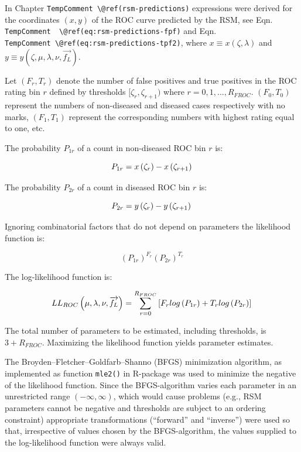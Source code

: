 \documentclass[
]{book}
\begin{document}
In Chapter \texttt{TempComment\ \textbackslash{}@ref(rsm-predictions)} expressions were derived for the coordinates \((x,y)\) of the ROC curve predicted by the RSM, see Eqn. \texttt{TempComment\ \ \textbackslash{}@ref(eq:rsm-predictions-fpf)} and Eqn. \texttt{TempComment\ \textbackslash{}@ref(eq:rsm-predictions-tpf2)}, where \(x\equiv x(\zeta,\lambda)\) and \(y \equiv y(\zeta , \mu, \lambda, \nu, \overrightarrow{f_L})\).

Let \((F_r,T_r)\) denote the number of false positives and true positives in the ROC rating bin \(r\) defined by thresholds \([\zeta_r, \zeta_{r+1})\) where \(r = 0, 1, ..., R_{FROC}\). \((F_0,T_0)\) represent the numbers of non-diseased and diseased cases respectively with no marks, \((F_1,T_1)\) represent the corresponding numbers with highest rating equal to one, etc.

The probability \(P_{1r}\) of a count in non-diseased ROC bin \(r\) is:

\begin{equation}
P_{1r} = x\left ( \zeta_r \right ) - x\left ( \zeta_{r+1} \right )\\ 
\label{eq:rsm-fitting-roc-p1r}
\end{equation}

The probability \(P_{2r}\) of a count in diseased ROC bin \(r\) is:

\begin{equation}
P_{2r} = y\left ( \zeta_r \right ) - y\left ( \zeta_{r+1} \right )\\ 
\label{eq:rsm-fitting-roc-p2r}
\end{equation}

Ignoring combinatorial factors that do not depend on parameters the likelihood function is:

\[\left ( P_{1r} \right )^{F_r}  \left ( P_{2r} \right )^{T_r}\]

The log-likelihood function is:

\begin{equation}
LL_{ROC} \left ( \mu, \lambda, \nu, \overrightarrow{f_L} \right )= \sum_{r=0}^{R_{FROC}} \left [F_r log \left (P_{1r}  \right ) + T_r log \left (P_{2r}  \right )  \right ] \\
\label{eq:rsm-fitting-roc-ll2}
\end{equation}

The total number of parameters to be estimated, including thresholds, is \(3+R_{FROC}\). Maximizing the likelihood function yields parameter estimates.

The Broyden--Fletcher--Goldfarb--Shanno (BFGS) \citep{shanno1970optimal, shanno1970conditioning, goldfarb1970family, fletcher1970new, fletcher2013practical, broyden1970convergence} minimization algorithm, as implemented as function \texttt{mle2()} in R-package \citep{R-bbmle} was used to minimize the negative of the likelihood function. Since the BFGS-algorithm varies each parameter in an unrestricted range \((-\infty, \infty)\), which would cause problems (e.g., RSM parameters cannot be negative and thresholds are subject to an ordering constraint) appropriate transformations (``forward'' and ``inverse'') were used so that, irrespective of values chosen by the BFGS-algorithm, the values supplied to the log-likelihood function were always valid.
\end{document}
